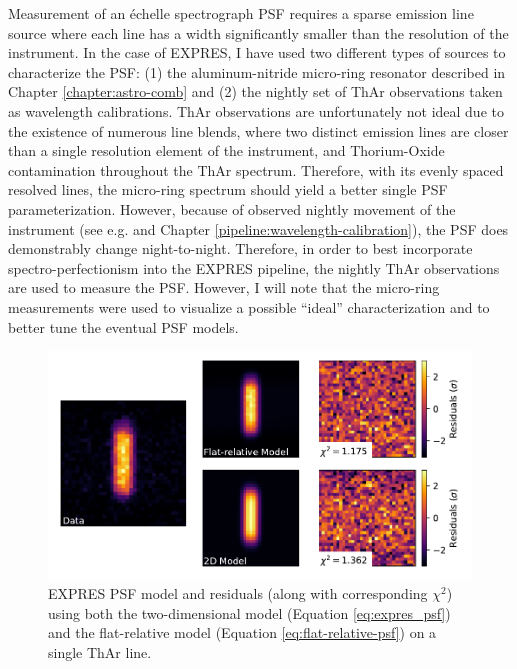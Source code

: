 Measurement of an \'echelle spectrograph PSF requires a sparse emission line source where each line has a width significantly smaller than the resolution of the instrument. In the case of EXPRES, I have used two different types of sources to characterize the PSF: (1) the aluminum-nitride micro-ring resonator described in Chapter \ref{chapter:astro-comb} and (2) the nightly set of ThAr observations taken as wavelength calibrations. ThAr observations are unfortunately not ideal due to the existence of numerous line blends, where two distinct emission lines are closer than a single resolution element of the instrument, and Thorium-Oxide contamination throughout the ThAr spectrum. Therefore, with its evenly spaced resolved lines, the micro-ring spectrum should yield a better single PSF parameterization. However, because of observed nightly movement of the instrument (see e.g. \citet{blackman_performance_2020} and Chapter \ref{pipeline:wavelength-calibration}), the PSF does demonstrably change night-to-night. Therefore, in order to best incorporate spectro-perfectionism into the EXPRES pipeline, the nightly ThAr observations are used to measure the PSF. However, I will note that the micro-ring measurements were used to visualize a possible ``ideal'' characterization and to better tune the eventual PSF models.

\begin{figure}
    \centering
    \includegraphics[width=\textwidth]{figures-5/expres-psf.pdf}
    \caption[EXPRES point spread function model]{EXPRES PSF model and residuals (along with corresponding $\chi^2$) using both the two-dimensional model (Equation \ref{eq:expres_psf}) and the flat-relative model (Equation \ref{eq:flat-relative-psf}) on a single ThAr line.}
    \label{fig:psf-resid}
\end{figure}

